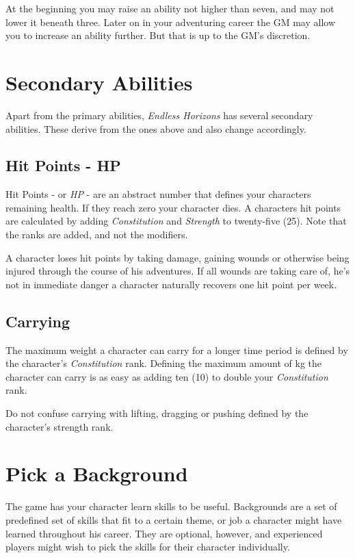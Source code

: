 At the beginning you may raise an ability not higher than seven, and may not
lower it beneath three. Later on in your adventuring career the GM may allow you
to increase an ability further. But that is up to the GM's discretion.

\section{Secondary Abilities}
\label{sec:2-Secondary Abilities}

Apart from the primary abilities, \emph{Endless Horizons} has several secondary
abilities. These derive from the ones above and also change accordingly.

\subsection{Hit Points - HP}
\label{sub:2-Hit Points}

Hit Points - or \emph{HP} - are an abstract number that defines your characters
remaining health. If they reach zero your character dies. A characters hit
points are calculated by adding \emph{Constitution} and \emph{Strength} to
twenty-five (25). Note that the ranks are added, and not the modifiers.

A character loses hit points by taking damage, gaining wounds or otherwise being
injured through the course of his adventures. If all wounds are taking care of,
he's not in immediate danger a character naturally recovers one hit point per
week.

\subsection{Carrying}
\label{subs:2-Carrying}

The maximum weight a character can carry for a longer time period is defined
by the character's \emph{Constitution} rank. Defining the maximum amount of kg
the character can carry is as easy as adding ten (10) to double your
\emph{Constitution} rank.

Do not confuse carrying with lifting, dragging or pushing defined by
the character's strength rank.

\section{Pick a Background}
\label{sec:2-Pick a Background}

The game has your character learn skills to be useful. Backgrounds are a set of
predefined set of skills that fit to a certain theme, or job a character might
have learned throughout his career. They are optional, however, and experienced
players might wish to pick the skills for their character individually.

